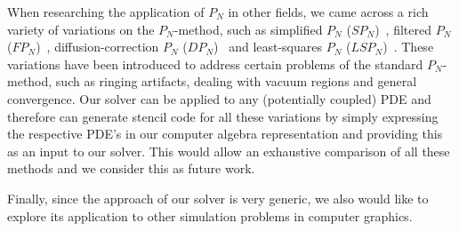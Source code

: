 When researching the application of $P_N$ in other fields, we came across a rich variety of variations on the $P_N$-method, such as simplified $P_N$ ($SP_N$)~\cite{Ryan10}, filtered $P_N$ ($FP_N$)~\cite{Radice13}, diffusion-correction $P_N$ ($DP_N$)~\cite{Schaefer11} and least-squares $P_N$ ($LSP_N$)~\cite{Hansen14}. These variations have been introduced to address certain problems of the standard $P_N$-method, such as ringing artifacts, dealing with vacuum regions and general convergence. Our solver can be applied to any (potentially coupled) PDE and therefore can generate stencil code for all these variations by simply expressing the respective PDE's in our computer algebra representation and providing this as an input to our solver. This would allow an exhaustive comparison of all these methods and we consider this as future work.

Finally, since the approach of our solver is very generic, we also would like to explore its application to other simulation problems in computer graphics.



